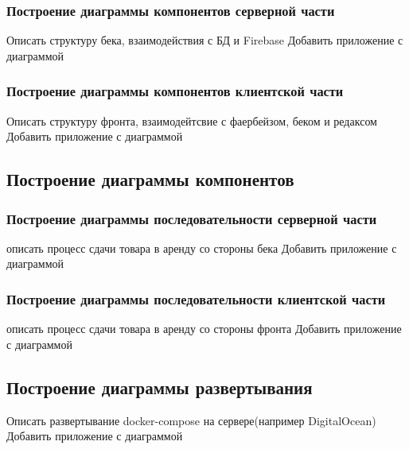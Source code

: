 \subsubsection{Построение диаграммы компонентов серверной части}
Описать структуру бека, взаимодействия с БД и Firebase
Добавить приложение с диаграммой

\subsubsection{Построение диаграммы компонентов клиентской части}
Описать структуру фронта, взаимодейтсвие с фаербейзом, беком и редаксом
Добавить приложение с диаграммой

\subsection{Построение диаграммы компонентов}
\subsubsection{Построение диаграммы последовательности серверной части}
описать процесс сдачи товара в аренду со стороны бека
Добавить приложение с диаграммой

\subsubsection{Построение диаграммы последовательности клиентской части}
описать процесс сдачи товара в аренду со стороны фронта
Добавить приложение с диаграммой

\subsection{Построение диаграммы развертывания}
Описать развертывание docker-compose на сервере(например DigitalOcean)
Добавить приложение с диаграммой
